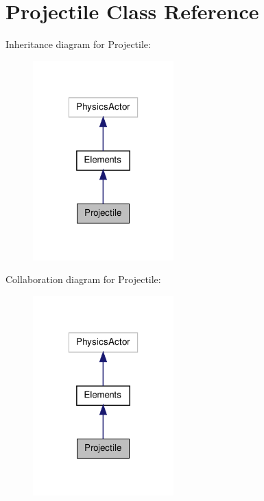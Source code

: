 \hypertarget{class_projectile}{\section{Projectile Class Reference}
\label{class_projectile}
}


Inheritance diagram for Projectile\-:\nopagebreak
\begin{figure}[H]
\begin{center}
\leavevmode
\includegraphics[width=154pt]{class_projectile__inherit__graph}
\end{center}
\end{figure}


Collaboration diagram for Projectile\-:\nopagebreak
\begin{figure}[H]
\begin{center}
\leavevmode
\includegraphics[width=154pt]{class_projectile__coll__graph}
\end{center}
\end{figure}
